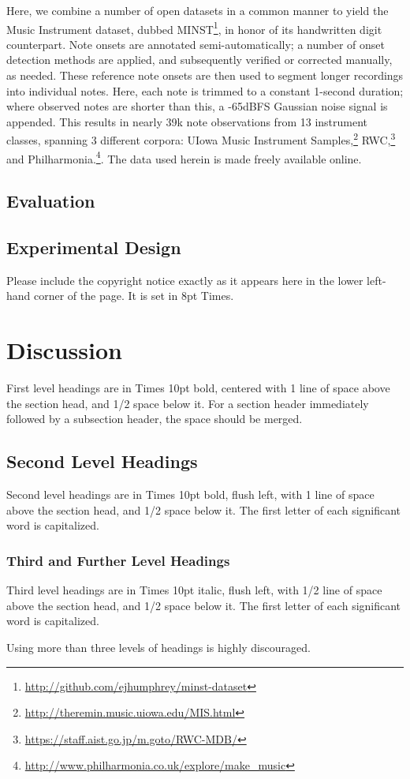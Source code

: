 \documentclass{article}
\begin{document}
Here, we combine a number of open datasets in a common manner to yield the Music Instrument dataset, dubbed MINST\footnote{\url{http://github.com/ejhumphrey/minst-dataset}}, in honor of its handwritten digit counterpart.
Note onsets are annotated semi-automatically;
a number of onset detection methods are applied, and subsequently verified or corrected manually, as needed.
These reference note onsets are then used to segment longer recordings into individual notes.
Here, each note is trimmed to a constant 1-second duration; where observed notes are shorter than this, a -65dBFS Gaussian noise signal is appended.
This results in nearly 39k note observations from 13 instrument classes, spanning 3 different corpora:
UIowa Music Instrument Samples,\footnote{\url{http://theremin.music.uiowa.edu/MIS.html}} RWC,\footnote{\url{https://staff.aist.go.jp/m.goto/RWC-MDB/}} and Philharmonia.\footnote{\url{http://www.philharmonia.co.uk/explore/make\_music}}.
The data used herein is made freely available online.


\subsection{Evaluation}



\subsection{Experimental Design}

Please include the copyright notice exactly as it appears here in the lower left-hand corner of the page.
It is set in 8pt Times.


\section{Discussion}

First level headings are in Times 10pt bold,
centered with 1 line of space above the section head, and 1/2 space below it.
For a section header immediately followed by a subsection header, the space should be merged.

\subsection{Second Level Headings}

Second level headings are in Times 10pt bold, flush left,
with 1 line of space above the section head, and 1/2 space below it.
The first letter of each significant word is capitalized.

\subsubsection{Third and Further Level Headings}

Third level headings are in Times 10pt italic, flush left,
with 1/2 line of space above the section head, and 1/2 space below it.
The first letter of each significant word is capitalized.

Using more than three levels of headings is highly discouraged.




\end{document}
